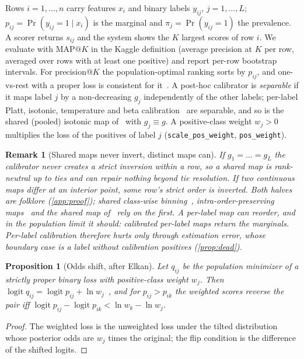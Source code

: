 \documentclass[sigconf,nonacm]{acmart}
\makeatletter
\newtheorem{proposition}{Proposition}
\newtheorem{remark}{Remark}
\newcommand{\mapk}{\mathrm{MAP}@K\xspace}
\makeatother
\begin{document}
Rows $i=1,\dots,n$ carry features $x_i$ and binary labels $y_{ij}$, $j=1,\dots,L$; $p_{ij}=\Pr(y_{ij}=1\mid x_i)$ is the marginal and $\pi_j=\Pr(y_{ij}=1)$ the prevalence. A scorer returns $s_{ij}$ and the system shows the $K$ largest scores of row $i$. We evaluate with $\mapk$ in the Kaggle definition (average precision at $K$ per row, averaged over rows with at least one positive) and report per-row bootstrap intervals. For precision@$K$ the population-optimal ranking sorts by $p_{ij}$, and one-vs-rest with a proper loss is consistent for it~\cite{Dembczynski2012Univariate,Koyejo2015Consistent,Menon2019Reductions}. A post-hoc calibrator is \emph{separable} if it maps label $j$ by a non-decreasing $g_j$ independently of the other labels; per-label Platt, isotonic, temperature and beta calibration~\cite{Platt1999,Zadrozny2002,Guo2017Calibration,Kull2017Beta} are separable, and so is the shared (pooled) isotonic map of~\cite{Ullah2025XMLCCalib} with $g_j\equiv g$. A positive-class weight $w_j>0$ multiplies the loss of the positives of label $j$ (\texttt{scale\_pos\_weight}, \texttt{pos\_weight}).

\begin{remark}[Shared maps never invert, distinct maps can]
\label{rem:shared}
If $g_1=\dots=g_L$ the calibrator never creates a strict inversion within a row, so a shared map is rank-neutral up to ties and can repair nothing beyond tie resolution. If two continuous maps differ at an interior point, some row's strict order is inverted. Both halves are folklore (\cref{app:proof}); shared class-wise binning~\cite{Patel2021IMax}, intra-order-preserving maps~\cite{Rahimi2020IntraOrder} and the shared map of~\cite{Ullah2025XMLCCalib} rely on the first. A per-label map can reorder, and in the population limit it should: calibrated per-label maps return the marginals. Per-label calibration therefore hurts only through estimation error, whose boundary case is a label without calibration positives (\cref{prop:dead}).
\end{remark}

\begin{proposition}[Odds shift, after Elkan]
\label{prop:odds}
Let $q_{ij}$ be the population minimizer of a strictly proper binary loss with positive-class weight $w_j$. Then $\operatorname{logit}q_{ij}=\operatorname{logit}p_{ij}+\ln w_j$~\cite{Elkan2001,Saerens2002}, and for $p_{ij}>p_{ik}$ the weighted scores reverse the pair iff $\operatorname{logit}p_{ij}-\operatorname{logit}p_{ik}<\ln w_k-\ln w_j$.
\end{proposition}
\begin{proof}
The weighted loss is the unweighted loss under the tilted distribution whose posterior odds are $w_j$ times the original; the flip condition is the difference of the shifted logits.
\end{proof}
\end{document}
